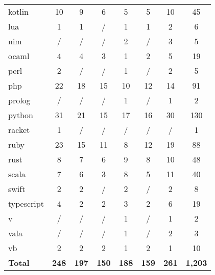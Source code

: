 \begin{table*}
\begin{tabular}{l|c|c|c|c|c|c|c}
        kotlin      & 10  & 9     & 6      & 5         & 5       & 10   & 45    \\
        lua         & 1   & 1     & /      & 1         & 1       & 2    & 6     \\
        nim         & /   & /     & /      & 2         & /       & 3    & 5     \\
        ocaml       & 4   & 4     & 3      & 1         & 2       & 5    & 19    \\
        perl        & 2   & /     & /      & 1         & /       & 2    & 5     \\
        php         & 22  & 18    & 15     & 10        & 12      & 14   & 91    \\
        prolog      & /   & /     & /      & 1         & /       & 1    & 2     \\
        python      & 31  & 21    & 15     & 17        & 16      & 30   & 130   \\
        racket      & 1   & /     & /      & /         & /       & /    & 1     \\
        ruby        & 23  & 15    & 11     & 8         & 12      & 19   & 88    \\
        rust        & 8   & 7     & 6      & 9         & 8       & 10   & 48    \\
        scala       & 7   & 6     & 3      & 8         & 5       & 11   & 40    \\
        swift       & 2   & 2     & /      & 2         & /       & 2    & 8     \\
        typescript  & 4   & 2     & 2      & 3         & 2       & 6    & 19    \\
        v           & /   & /     & /      & 1         & /       & 1    & 2     \\
        vala        & /   & /     & /      & 1         & /       & 2    & 3     \\
        vb          & 2   & 2     & 2      & 1         & 2       & 1    & 10    \\
        \midrule
        \bf Total       & \bf 248 & \bf 197   & \bf 150    & \bf 188       & \bf 159     & \bf 261  & \bf 1,203  \\
        \bottomrule
    \end{tabular}
\end{table*}